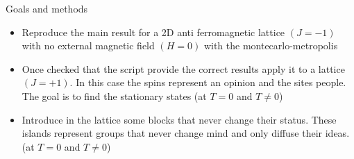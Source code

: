 \documentclass{beamer}
\begin{document}
\begin{frame}{Goals and methods}
\begin{itemize}
\item Reproduce the main result for a 2D anti ferromagnetic lattice $(J=-1)$ with no external magnetic field $(H=0)$ with the montecarlo-metropolis
\item  Once checked that the script provide the correct results apply it to a lattice $(J=+1)$.  In this case the spins represent an opinion and the sites people.  The goal is to find the stationary states (at $T=0$ and $T\neq0$)
\item Introduce in the lattice some blocks that never change their status.  These islands represent groups that never change mind and only diffuse their ideas.  (at $T=0$ and $T\neq0$)
\end{itemize}
\end{frame}
\end{document}
